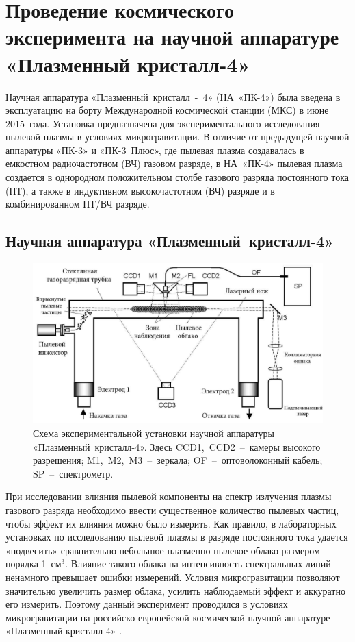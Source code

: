 \chapter{Проведение космического эксперимента на научной аппаратуре «Плазменный кристалл-4»}
\label{cha:ch_3}
Научная аппаратура «Плазменный~кристалл~-~4» (НА~«ПК-4») была введена в эксплуатацию на борту
Международной космической станции (МКС) в июне 2015~года. Установка предназначена для экспериментального
исследования пылевой плазмы в условиях микрогравитации. В отличие от предыдущей научной аппаратуры
«ПК-3» и «ПК-3~Плюс», где пылевая плазма создавалась в емкостном радиочастотном (ВЧ) газовом разряде,
в НА~«ПК-4» пылевая плазма создается в однородном положительном столбе газового разряда постоянного тока (ПТ),
а также в индуктивном высокочастотном (ВЧ) разряде и в комбинированном ПТ/ВЧ разряде.

\section{Научная аппаратура «Плазменный~кристалл-4»}
\begin{figure}[t]
  \centering
  \includegraphics[width=12cm]{figures/fig31}
  \caption{Схема экспериментальной установки научной аппаратуры «Плазменный~кристалл-4». Здесь CCD1,~CCD2~--~камеры высокого разрешения;
           M1,~M2,~M3~--~зеркала; OF~--~оптоволоконный кабель; SP~--~спектрометр.}
  \label{fig:fig31}
\end{figure}

При исследовании влияния пылевой компоненты на спектр излучения плазмы газового разряда необходимо ввести
существенное количество пылевых частиц, чтобы эффект их влияния можно было измерить. Как правило, в лабораторных
установках по исследованию пылевой плазмы в разряде постоянного тока удается «подвесить» сравнительно небольшое
плазменно-пылевое облако размером порядка 1~см$^3$. Влияние такого облака на интенсивность спектральных линий
ненамного превышает ошибки измерений. Условия микрогравитации позволяют значительно увеличить размер облака,
усилить наблюдаемый эффект и аккуратно его измерить. Поэтому данный эксперимент проводился в
условиях микрогравитации на российско-европейской космической научной аппаратуре «Плазменный кристалл-4» \cite{Usachev-Elbrus}.


